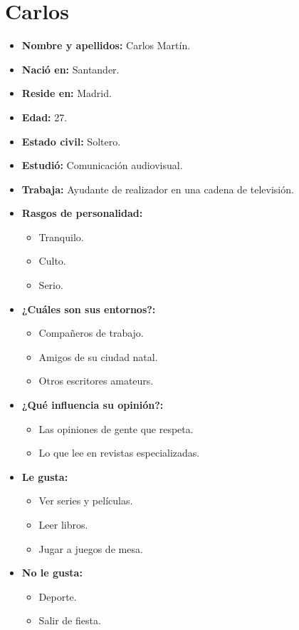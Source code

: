 \section{Carlos}
\begin{itemize}
    \item \textbf{Nombre y apellidos: } Carlos Martín.
    \item \textbf{Nació en: } Santander.
    \item \textbf{Reside en: } Madrid.
    \item \textbf{Edad: } 27.
    \item \textbf{Estado civil: } Soltero.
    \item \textbf{Estudió: } Comunicación audiovisual.
    \item \textbf{Trabaja: } Ayudante de realizador en una cadena de televisión.
    \item \textbf{Rasgos de personalidad: } 
    \begin{itemize}
      \item Tranquilo.
      \item Culto.
      \item Serio.
    \end{itemize}
    \item \textbf{¿Cuáles son sus entornos?: } 
    \begin{itemize}
      \item Compañeros de trabajo.
      \item Amigos de su ciudad natal.
      \item Otros escritores amateurs.
    \end{itemize}
    \item \textbf{¿Qué influencia su opinión?: } 
    \begin{itemize}
      \item Las opiniones de gente que respeta.
      \item Lo que lee en revistas especializadas.
    \end{itemize}
    \item \textbf{Le gusta: } 
    \begin{itemize}
      \item Ver series y películas.
      \item Leer libros.
      \item Jugar a juegos de mesa.
    \end{itemize}
    \item \textbf{No le gusta: } 
    \begin{itemize}
      \item Deporte.
      \item Salir de fiesta.
    \end{itemize}
  \end{itemize}